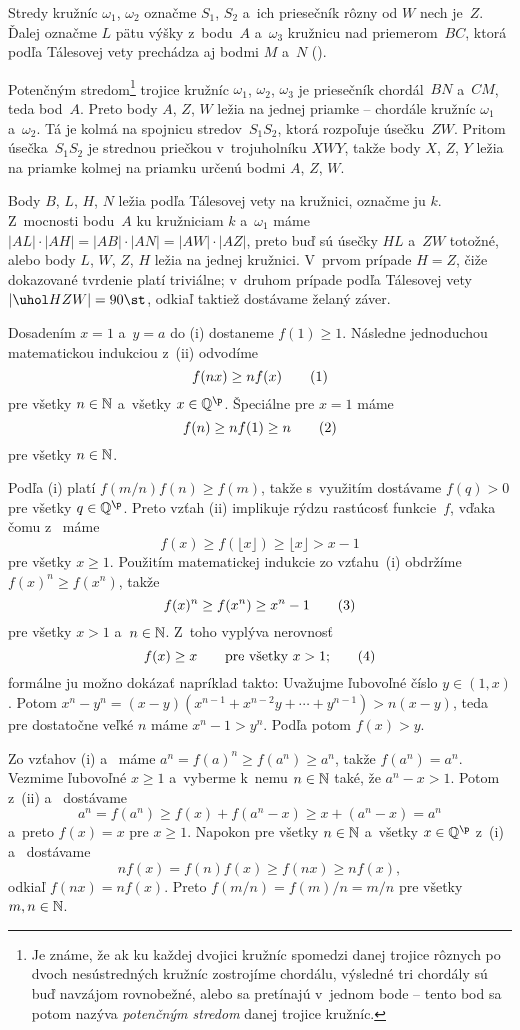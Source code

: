 {%
Stredy kružníc $\omega_1$, $\omega_2$ označme $S_1$, $S_2$ a~ich priesečník rôzny od $W$ nech je~$Z$.
Ďalej označme $L$ pätu výšky z~bodu~$A$ a~$\omega_3$ kružnicu nad priemerom~$BC$, ktorá podľa Tálesovej vety prechádza aj bodmi $M$ a~$N$ (\obr).
%

Potenčným stredom\footnote{Je známe, že ak ku každej dvojici kružníc spomedzi danej trojice rôznych po dvoch nesústredných kružníc zostrojíme chordálu, výsledné tri chordály sú buď navzájom rovnobežné, alebo sa pretínajú v~jednom bode -- tento bod sa potom nazýva {\it potenčným stredom\/} danej trojice kružníc.} trojice kružníc $\omega_1$, $\omega_2$, $\omega_3$ je priesečník chordál~$BN$ a~$CM$, teda bod~$A$.
Preto body $A$, $Z$, $W$ ležia na jednej priamke -- chordále kružníc $\omega_1$ a~$\omega_2$.
Tá je kolmá na spojnicu stredov~$S_1S_2$, ktorá rozpoľuje úsečku~$ZW$.
Pritom úsečka~$S_1S_2$ je strednou priečkou v~trojuholníku $XWY$, takže body $X$, $Z$, $Y$ ležia na priamke kolmej na priamku určenú bodmi $A$, $Z$, $W$.

Body $B$, $L$, $H$, $N$ ležia podľa Tálesovej vety na kružnici, označme ju $k$.
Z~mocnosti bodu~$A$ ku kružniciam $k$ a~$\omega_1$ máme $|AL|\cdot|AH|=|AB|\cdot|AN|=|AW|\cdot|AZ|$, preto buď sú úsečky $HL$ a~$ZW$ totožné, alebo body $L$, $W$, $Z$, $H$ ležia na jednej kružnici. V~prvom prípade $H=Z$, čiže dokazované tvrdenie platí triviálne; v~druhom prípade podľa Tálesovej vety $|\uhol HZW|=90\st$, odkiaľ taktiež dostávame želaný záver.}

{%
Dosadením $x = 1$ a~$y=a$ do (i) dostaneme $f(1) \ge 1$. Následne jednoduchou matematickou indukciou z~(ii) odvodíme
$$
f(nx) \ge nf(x)
\tag1
$$
pre všetky $n\in\Bbb N$ a~všetky $x\in\Bbb Q^{\p}$. Špeciálne pre $x=1$ máme
$$
f(n)\ge nf(1)\ge n
\tag2
$$
pre všetky $n\in\Bbb N$.

Podľa (i) platí $f(m/n)f(n)\ge f(m)$, takže s~využitím  dostávame $f(q) > 0$ pre všetky $q \in \Bbb Q^{\p}$. Preto vzťah (ii) implikuje rýdzu rastúcosť funkcie~$f$, vďaka čomu z~ máme
$$
f(x) \ge f(\lfloor x\rfloor)\ge \lfloor x\rfloor > x - 1
$$
pre všetky $x\ge1$.
Použitím matematickej indukcie zo vzťahu~(i) obdržíme $f(x)^n \ge f(x^n)$, takže
$$
f(x)^n \ge f(x^n)\ge x^n - 1
\tag3
$$
pre všetky $x > 1$ a~$n\in\Bbb N$.
Z~toho vyplýva nerovnosť
$$
f(x) \ge x\qquad\text{pre všetky $x > 1$;}
\tag4
$$
formálne ju možno dokázať napríklad takto: Uvažujme ľubovoľné číslo $y\in(1,x)$. Potom $x^n - y^n = (x - y)(x^{n-1} + x^{n-2}y + \cdots + y^{n-1}) > n(x - y)$, teda pre dostatočne veľké $n$ máme $x^n -1 > y^n$. Podľa  potom $f(x) > y$.

Zo vzťahov (i) a~ máme $a^n = f(a)^n \ge f(a^n)\ge a^n$, takže $f(a^n) = a^n$. Vezmime ľubovoľné $x \ge 1$ a~vyberme k~nemu $n\in\Bbb N$ také, že $a^n - x > 1$. Potom z~(ii) a~ dostávame
$$
a^n = f(a^n)
\ge
f(x) + f(a^n - x)
\ge
x + (a^n - x)
=
a^n
$$
a~preto $f(x) = x$ pre $x \ge 1$.
Napokon pre všetky $n\in \Bbb N$ a~všetky $x\in\Bbb Q^{\p}$ z~(i) a~ dostávame
$$
nf(x) = f(n)f(x) \ge f(nx)\ge nf(x),
$$
odkiaľ $f(nx) = nf(x)$. Preto $f(m/n) = f(m)/n = m/n$ pre všetky $m,n\in\Bbb N$.}

